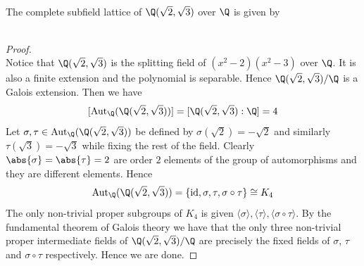 \documentclass[a4paper]{article}
\begin{document}
\begin{eg}{}{}\\
The complete subfield lattice of $\Q(\sqrt{2},\sqrt{3})$ over $\Q$ is given by \\
\\
\begin{proof}\\
Notice that $\Q(\sqrt{2},\sqrt{3})$ is the splitting field of $(x^2-2)(x^2-3)$ over $\Q$. It is also a finite extension and the polynomial is separable. Hence $\Q(\sqrt{2},\sqrt{3})/\Q$ is a Galois extension. Then we have $$[\text{Aut}_\Q(\Q(\sqrt{2},\sqrt{3}))]=[\Q(\sqrt{2},\sqrt{3}):\Q]=4$$ Let $\sigma,\tau\in\text{Aut}_\Q(\Q(\sqrt{2},\sqrt{3}))$ be defined by $\sigma(\sqrt{2})=-\sqrt{2}$ and similarly $\tau(\sqrt{3})=-\sqrt{3}$ while fixing the rest of the field. Clearly $\abs{\sigma}=\abs{\tau}=2$ are order $2$ elements of the group of automorphisms and they are different elements. Hence $$\text{Aut}_\Q(\Q(\sqrt{2},\sqrt{3}))=\{\text{id},\sigma,\tau,\sigma\circ\tau\}\cong K_4$$ The only non-trivial proper subgroups of $K_4$ is given $\langle\sigma\rangle,\langle\tau\rangle,\langle\sigma\circ\tau\rangle$. By the fundamental theorem of Galois theory we have that the only three non-trivial proper intermediate fields of $\Q(\sqrt{2},\sqrt{3})/\Q$ are precisely the fixed fields of $\sigma$, $\tau$ and $\sigma\circ\tau$ respectively. Hence we are done. 
\end{proof}
\end{eg}
\end{document}
